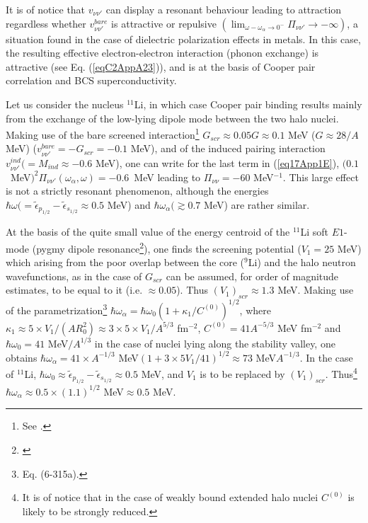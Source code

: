 It is of notice that $v_{\nu\nu'}$ can display a resonant behaviour leading to attraction regardless whether $v_{\nu\nu'}^{bare}$ is attractive or repulsive $(\lim_{\omega-\omega_\alpha\to0^-}\Pi_{\nu\nu'}\to-\infty)$, a situation found in the case of dielectric polarization effects in metals. In this case, the resulting effective electron-electron interaction (phonon exchange) is attractive (see Eq. (\ref{eqC2AppA23})), and is at the basis of Cooper pair correlation and BCS superconductivity.

Let us consider the nucleus $^{11}$Li, in which case Cooper pair binding results mainly from the exchange of the low-lying dipole mode between the two halo nuclei. Making use of the bare screened interaction\footnote{See \cite{Broglia:19b}.} $G_{scr}\approx0.05G\approx0.1$ MeV ($G\approx 28/A$ MeV) ($v_{\nu\nu'}^{bare}=-G_{scr}=-0.1$ MeV), and of the induced pairing interaction $v^{ind}_{\nu\nu'}(=M_{ind}\approx-0.6$ MeV), one can write for the last term in (\ref{eq17App1E}), \mbox{$(0.1$ MeV$)^2\Pi_{\nu\nu'}(\omega_\alpha,\omega)=-0.6$ MeV} leading to $\Pi_{\nu\nu}=-60$ MeV$^{-1}$. This large effect is not a strictly resonant phenomenon, although the energies $\hbar\omega(=\tilde\epsilon_{p_{1/2}}-\tilde\epsilon_{s_{1/2}}\approx0.5$ MeV) and $\hbar\omega_\alpha(\gtrsim0.7$ MeV) are rather similar. 

At the basis of the quite small value of the energy centroid of the $^{11}$Li soft $E1$-mode (pygmy dipole resonance\footnote{\cite{Broglia:19}}), one finds the screening potential ($V_1=25$ MeV) which arising from the poor overlap between the core ($^9$Li) and the halo neutron wavefunctions, as in the case of $G_{scr}$ can be assumed, for order of magnitude estimates, to be equal to it (i.e. $\approx0.05$). Thus $(V_1)_{scr}\approx1.3$ MeV. Making use of the parametrization\footnote{\cite{Bohr:75} Eq. (6-315a).} $\hbar\omega_\alpha=\hbar\omega_0\left(1+\kappa_1/C^{(0)}\right)^{1/2}$, where $\kappa_1\approx 5\times V_1/(AR_0^2)\approx 3\times5\times V_1/A^{5/3}$ fm$^{-2}$, $C^{(0)}=41A^{-5/3}$ MeV fm$^{-2}$ and $\hbar\omega_0=41$ MeV$/A^{1/3}$ in the case of nuclei lying along the stability valley, one obtains $\hbar\omega_\alpha=41\times A^{-1/3}$ MeV$\left(1+3\times5V_1/41\right)^{1/2}\approx73$ MeV$A^{-1/3}$. In the case of $^{11}$Li, $\hbar\omega_0\approx\tilde\epsilon_{p_{1/2}}-\tilde\epsilon_{s_{1/2}}\approx0.5$ MeV, and $V_1$ is to be replaced by $(V_1)_{scr}$. Thus\footnote{It is of notice that in the case of weakly bound extended halo nuclei $C^{(0)}$ is likely to be strongly reduced.} $\hbar\omega_\alpha\approx0.5\times(1.1)^{1/2}$  MeV$\approx0.5$ MeV.

